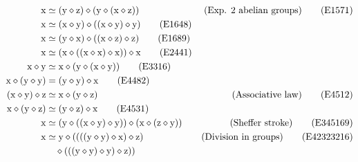 \begin{align}
        \x &\formaleq (\y \op \z) \op (\y \op (\x \op \z)) & \hbox{(Exp. $2$ abelian groups)} \label{eq1571}\tag{E1571} \\
        \x &\formaleq (\x \op \y) \op ((\x \op \y) \op \y) \label{eq1648}\tag{E1648} \\
        \x &\formaleq (\y \op \x) \op ((\x \op \z) \op \z) \label{eq1689}\tag{E1689} \\
        \x &\formaleq (\x \op ((\x \op \x) \op \x)) \op \x \label{eq2441}\tag{E2441} \\
        \x \op \y &\formaleq \x \op (\y \op (\x \op \y)) \label{eq3316}\tag{E3316} \\
        \x \op (\y \op \y) &= (\y \op \y) \op \x \label{eq4482}\tag{E4482} \\
        (\x \op \y) \op \z &\formaleq \x \op (\y \op \z) &\hbox{(Associative law)} \label{eq4512}\tag{E4512}\\
        \x \op (\y \op \z) &\formaleq (\y \op \z) \op \x \label{eq4531}\tag{E4531} \\
        \x &\formaleq (\y \op ((\x \op \y) \op \y)) \op (\x \op (\z \op \y)) & \hbox{(Sheffer stroke)} \label{eq345169}\tag{E345169} \\
        \x &\formaleq \y \op ((((\y \op \y) \op \x) \op \z) & \hbox{(Division in groups)} \label{eq42323216}\tag{E42323216} \\
        & \quad  \op (((\y \op \y) \op \y) \op \z)) \nonumber
\end{align}
